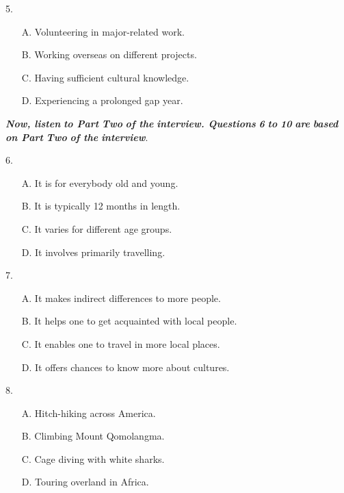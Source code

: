 \documentclass[UTF8,11pt]{ctexart}
\begin{document}
5.


\begin{itemize}[leftmargin=2em,itemsep=.2em,topsep=.4em]\item[A.] Volunteering in major-related work.
\item[B.] Working overseas on different projects.
\item[C.] Having sufficient cultural knowledge.
\item[D.] Experiencing a prolonged gap year.
\end{itemize}

\textbf{\textit{Now, listen}} \textbf{\textit{to Part}} \textbf{\textit{Two}} \textbf{\textit{of the}} \textbf{\textit{interview. Questions}} \textbf{\textit{6}} \textbf{\textit{to}} \textbf{\textit{10}} \textbf{\textit{are}} \textbf{\textit{based on Part}} \textbf{\textit{Two}} \textbf{\textit{of the}} \textbf{\textit{interview}}.


6.


\begin{itemize}[leftmargin=2em,itemsep=.2em,topsep=.4em]\item[A.] It is for everybody old and young.
\item[B.] It is typically 12 months in length.
\item[C.] It varies for different age groups.
\item[D.] It involves primarily travelling.
\end{itemize}

7.


\begin{itemize}[leftmargin=2em,itemsep=.2em,topsep=.4em]\item[A.] It makes indirect differences to more people.
\item[B.] It helps one to get acquainted with local people.
\item[C.] It enables one to travel in more local places.
\item[D.] It offers chances to know more about cultures.
\end{itemize}

8.


\begin{itemize}[leftmargin=2em,itemsep=.2em,topsep=.4em]\item[A.] Hitch-hiking across America.
\item[B.] Climbing Mount Qomolangma.
\item[C.] Cage diving with white sharks.
\item[D.] Touring overland in Africa.
\end{itemize}
\end{document}
